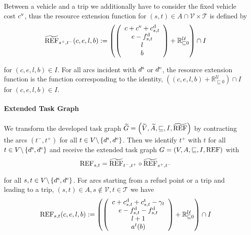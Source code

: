 Between a vehicle and a trip we additionally have to consider the fixed vehicle cost $c^{\operatorname{v}}$, thus the resource extension function for ${(s,t)\in A\cap\mathcal{V}\times\mathcal{T}}$ is defined by
\begin{align*}
	\widetilde{\operatorname{REF}}_{s^+,t^-}(c,e,l,b) := \left(\left(
	\begin{array}{c}
		c + c^{\operatorname{v}} + c^{\operatorname{d}}_{s,t} \\ e-f^{\operatorname{d}}_{s,t} \\ l \\ b
	\end{array}
	\right) + \mathbb{R}^{\mathcal{U}}_{\sqsubseteq 0}\right) \cap I
\end{align*}

for $(c,e,l,b)\in I$. For all arcs incident with $d^{\operatorname{s}}$ or $d^{\operatorname{e}}$, the resource extension function is the function corresponding to the identity, \ie ${\left((c,e,l,b)+\mathbb{R}^{\mathcal{U}}_{\sqsubseteq 0}\right)\cap I}$ for ${(c,e,l,b)\in I}$.

\paragraph{Extended Task Graph} \parfill

We transform the developed task graph ${\widetilde{G}=\left(\widetilde{V},\widetilde{A},\sqsubseteq,I,\widetilde{\operatorname{REF}}\right)}$ by contracting the arcs $\left(t^-,t^+\right)$ for all $t\in V\backslash\left\{d^{\operatorname{s}},d^{\operatorname{e}}\right\}$. Then we identify $t^+$ with $t$ for all $t\in V\backslash\left\{d^{\operatorname{s}},d^{\operatorname{e}}\right\}$ and receive the extended task graph ${G=\left(V,A,\sqsubseteq,I,\operatorname{REF}\right)}$ with
\begin{align*}
	\operatorname{REF}_{s,t} = \widetilde{\operatorname{REF}}_{t^-,t^+}\circ\widetilde{\operatorname{REF}}_{s^+,t^-}
\end{align*}

for all $s,t\in V\backslash\left\{d^{\operatorname{s}},d^{\operatorname{e}}\right\}$. For arcs starting from a refuel point or a trip and leading to a trip, \ie ${(s,t)\in A,s\notin\mathcal{V},t\in\mathcal{T}}$ we have
\begin{align*}
	\operatorname{REF}_{s,t}(c,e,l,b) := \left(\left(
	\begin{array}{c}
		c + c^{\operatorname{d}}_{s,t} + c^{\operatorname{t}}_{s,t} - \gamma_t \\ e - f^{\operatorname{d}}_{s,t} - f^{\operatorname{d}}_{s,t} \\ l + 1 \\ a^t(b)
	\end{array}
	\right) + \mathbb{R}^{\mathcal{U}}_{\sqsubseteq 0}\right) \cap I
\end{align*}

